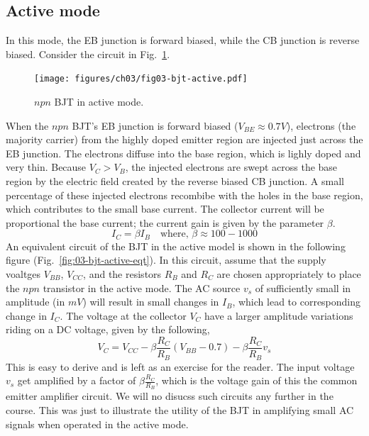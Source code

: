 \subsection{Active mode}
In this mode, the EB junction is forward biased, while the CB junction is reverse biased. Consider the circuit in Fig.~\ref{fig:03-bjt-active}.
\begin{figure}[h]
    \centering
    \texttt{[image: figures/ch03/fig03-bjt-active.pdf]}
    \caption{$npn$ BJT in active mode.}
    \label{fig:03-bjt-active}
\end{figure}
When the $npn$ BJT's EB junction is forward biased ($V_{BE} \approx 0.7V$), electrons (the majority carrier) from the highly doped emitter region are injected just across the EB junction. The electrons diffuse into the base region, which is lighly doped and very thin. Because $V_C > V_B$, the injected electrons are swept across the base region by the electric field created by the reverse biased CB junction. A small percentage of these injected electrons recombibe with the holes in the base region, which contributes to the small base current. The collector current will be proportional the base current; the current gain is given by the parameter $\beta$.
\begin{equation}
    I_C = \beta I_B \quad \text{where, } \beta \approx 100 - 1000
    \label{eq:03-bjt-active-ic}
\end{equation}
An equivalent circuit of the BJT in the active model is shown in the following figure (Fig.~\ref{fig:03-bjt-active-eqt}). In this circuit, assume that the supply voaltges $V_{BB}$, $V_{CC}$, and the resistors $R_B$ and $R_C$ are chosen appropriately to place the $npn$ transistor in the active mode. The AC source $v_{s}$ of sufficiently small in amplitude (in $mV$) will result in small changes in $I_B$, which lead to corresponding change in $I_C$. The voltage at the collector $V_C$ have a larger amplitude variations riding on a DC voltage, given by the following,
\begin{equation}
    V_C = V_{CC} - \beta \frac{R_C}{R_B}\left(V_{BB} - 0.7 \right) -  \beta \frac{R_C}{R_B} v_s
    \label{eq:03-bjt-active-vc}
\end{equation}
This is easy to derive and is left as an exercise for the reader. The input voltage $v_s$ get amplified by a factor of $\beta \frac{R_C}{R_B}$, which is the voltage gain of this the common emitter amplifier circuit. We will no disucss such circuits any further in the course. This was just to illustrate the utility of the BJT in amplifying small AC signals when operated in the active mode.

